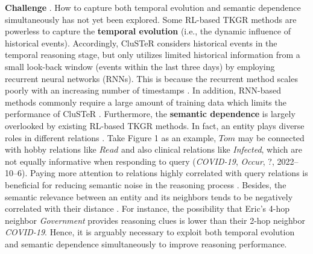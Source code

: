 \documentclass[sigconf,natbib=true]{acmart}
\begin{document}


\textbf{Challenge \uppercase\expandafter{}}. How to capture both temporal evolution and semantic  dependence simultaneously has not yet been explored. %
Some RL-based TKGR methods \cite{TPath, TAgent,TiTer} are powerless to capture the \textbf{temporal evolution} (i.e., the dynamic influence of historical events). Accordingly,  CluSTeR \cite{Cluster} considers historical events in the temporal reasoning stage, but only utilizes limited historical information from a small look-back window (events within the last three days) by employing recurrent neural networks (RNNs). This is because the recurrent method scales poorly with an increasing number of timestamps \cite{attention}. In addition, RNN-based methods commonly require a large amount of training data which limits the performance of CluSTeR \cite{RNNsurvey}. Furthermore, the \textbf{semantic dependence} is largely overlooked by existing RL-based TKGR methods. In fact, an entity plays diverse roles in different relations \cite{ATTNPath}. Take Figure 1 as an example, $Tom$ may be connected with hobby relations like $Read$ and also clinical relations like \emph{Infected}, which are not equally informative when responding to query (\emph{COVID-19}, \emph{Occur}, ?, 2022--10--6). Paying more attention to relations highly correlated with query relations is beneficial for reducing semantic noise in the reasoning process \cite{renvid}. Besides, the semantic relevance between an entity and its neighbors tends to be negatively correlated with their distance \cite{GMH}. %
For instance, the possibility that Eric's 4-hop neighbor \emph{Government} provides reasoning clues is lower than their  2-hop neighbor \emph{COVID-19}. Hence, it is arguably necessary to exploit both temporal evolution and semantic dependence simultaneously to improve reasoning performance.
\end{document}
